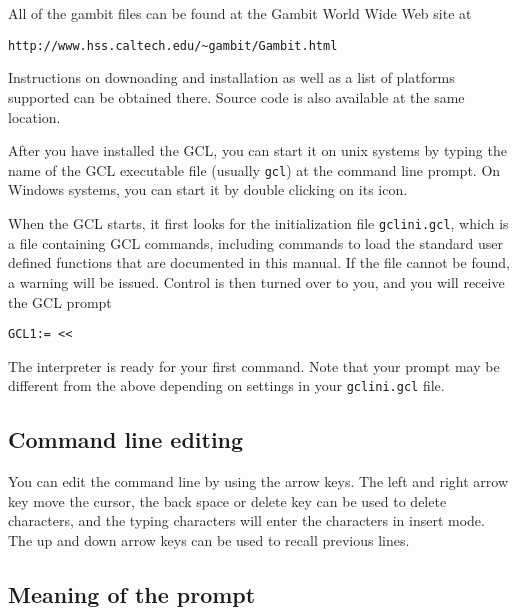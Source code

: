 \section{}
All of the gambit files can be found at the Gambit World Wide Web site
at

\begin{verbatim}
http://www.hss.caltech.edu/~gambit/Gambit.html
\end{verbatim} 

\noindent Instructions on downoading and installation as well as a
list of platforms supported can be obtained there.  Source code is
also available at the same location. 

After you have installed the GCL, you can start it on unix systems by
typing the name of the GCL executable file (usually \verb+gcl+) at the
command line prompt.  On Windows systems, you can start it by double
clicking on its icon.

When the GCL starts, it first looks for the initialization file
\verb+gclini.gcl+, which is a file containing GCL commands, including
commands to load the standard user defined functions that are
documented in this manual.  If the file cannot be found, a warning
will be issued.  Control is then turned over to you, and you will
receive the GCL prompt

\begin{verbatim}
GCL1:= << 
\end{verbatim}

\noindent The interpreter is ready for your first command.  Note that
your prompt may be different from the above depending on settings in
your \verb+gclini.gcl+ file.  

\subsection{Command line editing}

You can edit the command line by using the arrow keys. The left and
right arrow key move the cursor, the back space or delete key can be
used to delete characters, and the typing characters will enter the
characters in insert mode. The up and down arrow keys can be used to
recall previous lines.  

\subsection{Meaning of the prompt}

